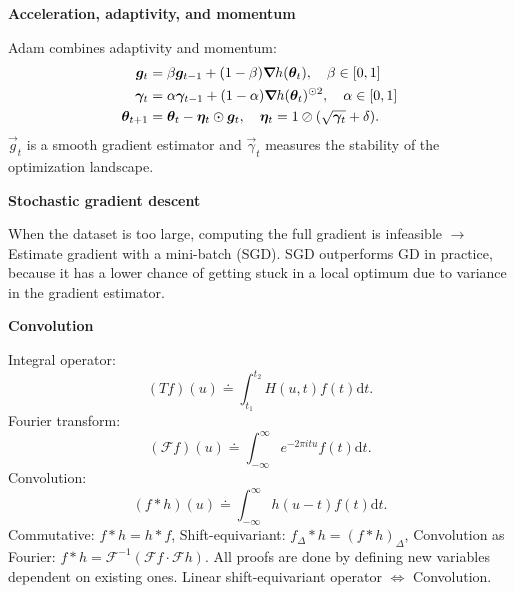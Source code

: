 \documentclass[10pt]{article}
\newenvironment{topic}[1]
{\textbf{\sffamily \colorbox{black}{\rlap{\textbf{\textcolor{white}{#1}}}\hspace{\linewidth}\hspace{-2\fboxsep}}}}
{}
\newenvironment{subtopic}[1]
{\begin{center}\textbf{\sffamily #1}\end{center}}
{}
\begin{document}
\begin{multicols*}{3}
\begin{topic}{Gradient-based learning}
\begin{subtopic}{Acceleration, adaptivity, and momentum}
            Adam combines adaptivity and momentum:
            \begin{align*}
                \bm{g}_t          & = \beta \bm{g}_{t-1} + (1-\beta) \bm{\nabla}_{\! } h(\bm{\theta}_t), \quad \beta \in [0,1]                               \\
                \bm{\gamma}_t     & = \alpha\bm{\gamma}_{t-1} + (1-\alpha) \bm{\nabla}_{\! } h(\bm{\theta}_t)^{\odot 2}, \quad \alpha \in [0,1]              \\
                \bm{\theta}_{t+1} & = \bm{\theta}_t - \bm{\eta}_t \odot \bm{g}_t, \quad \bm{\eta}_t = 1 \oslash (\sqrt{\bm{\gamma}_t} + \delta).
            \end{align*}
            $\vec{g}_t$ is a smooth gradient estimator and $\vec{\gamma}_t$ measures the stability of the optimization landscape.
        \end{subtopic}

        \begin{subtopic}{Stochastic gradient descent}
            When the dataset is too large, computing the full gradient is infeasible $\to$ Estimate
            gradient with a mini-batch (SGD). SGD outperforms GD in practice, because it has a lower
            chance of getting stuck in a local optimum due to variance in the gradient estimator.
        \end{subtopic}

    \end{topic}

    \begin{topic}{Convolutional networks}

        \begin{subtopic}{Convolution}
            Integral operator: \[
                (Tf)(u) \doteq \int_{t_1}^{t_2} H(u,t) f(t) \mathrm{d}t.
            \]
            Fourier transform: \[
                (\mathcal{F}f)(u) \doteq \int_{-\infty}^\infty e^{-2\pi itu} f(t) \mathrm{d}t.
            \]
            Convolution: \[
                (f * h)(u) \doteq \int_{-\infty}^{\infty} h(u-t) f(t) \mathrm{d}t.
            \]
            Commutative: $f * h = h * f$, Shift-equivariant: $f_{\Delta} * h = (f * h)_{\Delta}$, Convolution
            as Fourier: $f * h = \mathcal{F}^{-1}(\mathcal{F}f \cdot \mathcal{F}h)$. All proofs are done by
            defining new variables dependent on existing ones. Linear shift-equivariant operator $\iff$
            Convolution.


\end{subtopic}
\end{topic}
\end{multicols*}
\end{document}
